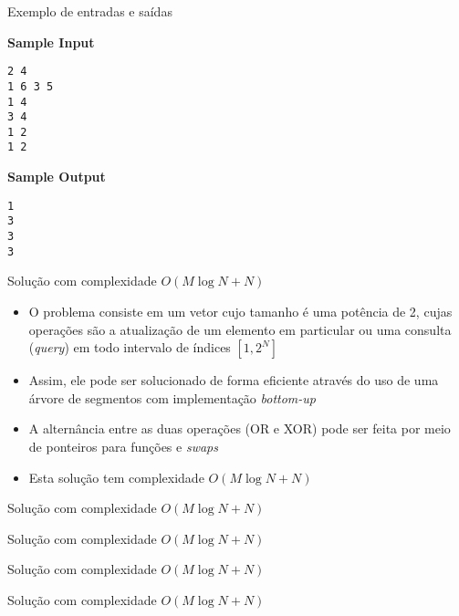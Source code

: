 \begin{frame}[fragile]{Exemplo de entradas e saídas}

\begin{minipage}[t]{0.5\textwidth}
\textbf{Sample Input}
\begin{verbatim}
2 4
1 6 3 5
1 4
3 4
1 2
1 2
\end{verbatim}
\end{minipage}
\begin{minipage}[t]{0.45\textwidth}
\textbf{Sample Output}
\begin{verbatim}
1
3
3
3
\end{verbatim}
\end{minipage}
\end{frame}

\begin{frame}[fragile]{Solução com complexidade $O(M\log N + N)$}

    \begin{itemize}
        \item O problema consiste em um vetor cujo tamanho é uma potência de 2, cujas operações
            são a atualização de um elemento em particular ou uma consulta (\textit{query}) em
            todo intervalo de índices $[1, 2^N]$

        \item Assim, ele pode ser solucionado de forma eficiente através do uso de uma árvore de
            segmentos com implementação \textit{bottom-up}

        \item A alternância entre as duas operações (OR e XOR) pode ser feita por meio de
            ponteiros para funções e \textit{swaps}

        \item Esta solução tem complexidade $O(M\log N + N)$

   \end{itemize}

\end{frame}

\begin{frame}[fragile]{Solução com complexidade $O(M\log N + N)$}
\end{frame}

\begin{frame}[fragile]{Solução com complexidade $O(M\log N + N)$}
\end{frame}

\begin{frame}[fragile]{Solução com complexidade $O(M\log N + N)$}
\end{frame}

\begin{frame}[fragile]{Solução com complexidade $O(M\log N + N)$}
\end{frame}

